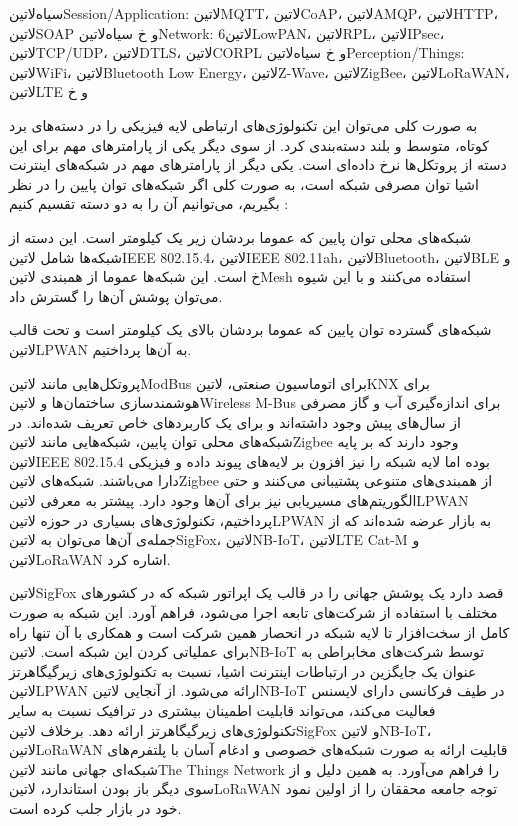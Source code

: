  ‌سیاه{‌لاتین{Session/Application}}: ‌لاتین{MQTT}، ‌لاتین{CoAP}، ‌لاتین{AMQP}، ‌لاتین{HTTP}، ‌لاتین{SOAP} و ‌خ
 ‌سیاه{‌لاتین{Network}}: ‌لاتین{6LowPAN}، ‌لاتین{RPL}، ‌لاتین{IPsec}، ‌لاتین{TCP/UDP}، ‌لاتین{DTLS}، ‌لاتین{CORPL} و ‌خ
 ‌سیاه{‌لاتین{Perception/Things}}: ‌لاتین{WiFi}، ‌لاتین{Bluetooth Low Energy}، ‌لاتین{Z-Wave}، ‌لاتین{ZigBee}، ‌لاتین{LoRaWAN}، ‌لاتین{LTE} و ‌خ

به صورت کلی می‌توان این تکنولوژی‌های ارتباطی لایه فیزیکی را در دسته‌های برد کوتاه، متوسط و بلند دسته‌بندی کرد.
از سوی دیگر یکی از پارامترهای مهم برای این دسته از پروتکل‌ها نرخ داده‌ای است. یکی دیگر از پارامترهای مهم در شبکه‌های اینترنت اشیا توان مصرفی شبکه است، به صورت کلی اگر شبکه‌های توان پایین را
در نظر بگیریم، می‌توانیم آن را به دو دسته تقسیم کنیم :

 شبکه‌های محلی توان پایین که عموما بردشان زیر یک کیلومتر است. این دسته از شبکه‌ها شامل ‌لاتین{IEEE 802.15.4}، ‌لاتین{IEEE 802.11ah}، ‌لاتین{Bluetooth}، ‌لاتین{BLE} و ‌خ است.
این شبکه‌ها عموما از همبندی ‌لاتین{Mesh} استفاده می‌کنند و با این شیوه می‌توان پوشش آن‌ها را گسترش داد.

 شبکه‌های گسترده توان پایین که عموما بردشان بالای یک کیلومتر است و تحت قالب ‌لاتین{LPWAN} به آن‌ها پرداختیم.

پروتکل‌هایی مانند ‌لاتین{ModBus} برای اتوماسیون صنعتی، ‌لاتین{KNX} برای هوشمند‌سازی ساختمان‌ها و ‌لاتین{Wireless M-Bus} برای اندازه‌گیری آب و گاز مصرفی از سال‌های پیش وجود داشته‌اند
و برای یک کاربردهای خاص تعریف شده‌اند.
در شبکه‌های محلی توان پایین، شبکه‌هایی مانند ‌لاتین{Zigbee} وجود دارند که بر پایه ‌لاتین{IEEE 802.15.4} بوده اما لایه شبکه را نیز افزون بر لایه‌های پیوند داده و فیزیکی دارا می‌باشند. شبکه‌های ‌لاتین{Zigbee}
از همبندی‌های متنوعی پشتیبانی می‌کنند و حتی الگوریتم‌های مسیریابی نیز برای آن‌ها وجود دارد.
پیشتر به معرفی ‌لاتین{LPWAN} پرداختیم، تکنولوژی‌های بسیاری در حوزه ‌لاتین{LPWAN} به بازار عرضه شده‌اند که از جمله‌ی آن‌ها می‌توان به ‌لاتین{SigFox}، ‌لاتین{NB-IoT}، ‌لاتین{LTE Cat-M} و ‌لاتین{LoRaWAN}
اشاره کرد.

‌لاتین{SigFox} قصد دارد یک پوشش جهانی را در قالب یک اپراتور شبکه که در کشورهای مختلف با استفاده از شرکت‌های تابعه اجرا می‌شود، فراهم آورد.
این شبکه به صورت کامل از سخت‌افزار تا لایه شبکه در انحصار همین شرکت است و همکاری با آن تنها راه برای عملیاتی کردن این شبکه است.
‌لاتین{NB-IoT} توسط شرکت‌های مخابراطی به عنوان یک جایگزین در ارتباطات اینترنت اشیا، نسبت به تکنولوژی‌های زیرگیگاهرتز ‌لاتین{LPWAN} ارائه می‌شود.
از آنجایی ‌لاتین{NB-IoT} در طیف فرکانسی دارای لایسنس فعالیت می‌کند، می‌تواند قابلیت اطمینان بیشتری در ترافیک نسبت به سایر تکنولوژی‌های زیرگیگاهرتز ارائه دهد.
برخلاف ‌لاتین{SigFox} و ‌لاتین{NB-IoT}، ‌لاتین{LoRaWAN} قابلیت ارائه به صورت شبکه‌های خصوصی و ادغام آسان با پلتفرم‌های شبکه‌ای جهانی مانند ‌لاتین{The Things Network} را فراهم می‌آورد.
به همین دلیل و از سوی دیگر باز بودن استاندارد، ‌لاتین{LoRaWAN} توجه جامعه محققان را از اولین نمود خود در بازار جلب کرده است.

